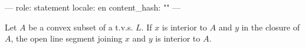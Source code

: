 ---
role: statement
locale: en
content_hash: ""
---

Let $A$ be a convex subset of a t.v.s. $L$. If $x$ is interior to $A$ and $y$ in the closure of $A$, the open line segment joining $x$ and $y$ is interior to $A$.
